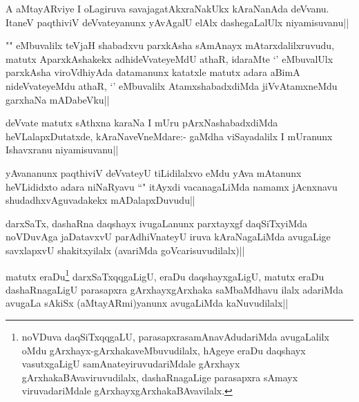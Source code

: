 
\begin{artha}
A aMtayARviye I oLagiruva savajagatAkxraNakUkx kAraNanAda deVvanu. ItaneV paqthiviV deVvateyanunx yAvAgalU elAlx dashegaLalUlx niyamisuvanu||
\end{artha}


\begin{artha}
"\stext " eMbuvalilx teVjaH shabadxvu parxkAsha sAmAnayx mAtarxdalilxruvudu, matutx AparxkAshakekx adhideVvateyeMdU athaR, idaraMte `\stext ' eMbuvalUlx parxkAsha viroVdhiyAda datamanunx katatxle matutx adara aBimA nideVvateyeMdu athaR, `\stext ' eMbuvalilx AtamxshabadxdiMda jiVvAtamxneMdu garxhaNa mADabeVku||
\end{artha}%


\begin{artha}
deVvate matutx sAthxna karaNa I mUru pArxNashabadxdiMda heVLalapxDutatxde, kAraNaveVneMdare:- gaMdha viSayadalilx I mUranunx Ishavxranu niyamisuvanu||
\end{artha}


\begin{artha}
yAvananunx paqthiviV deVvateyU tiLidilalxvo eMdu yAva mAtanunx heVLididxto adara niNaRyavu ``\stext " itAyxdi vacanagaLiMda namamx jAcnxnavu shudadhxvAguvadakekx mADalapxDuvudu||
\end{artha}


\begin{artha}
darxSaTx, dashaRna daqshayx ivugaLanunx parxtayxgf daqSiTxyiMda noVDuvAga jaDatavxvU parAdhiVnateyU iruva kAraNagaLiMda avugaLige savxlapxvU shakitxyilalx (avariMda goVcarisuvudilalx)||
\end{artha}

\begin{artha}%
matutx eraDu\footnote[1]{noVDuva daqSiTxqqgaLU, parasapxrasamAnavAdudariMda avugaLalilx oMdu gArxhayx-gArxhakaveMbuvudilalx, hAgeye eraDu daqshayx vasutxgaLigU samAnateyiruvudariMdale gArxhayx gArxhakaBAvaviruvudilalx, dashaRnagaLige parasapxra sAmayx viruvadariMdale gArxhayxgArxhakaBAvavilalx.} darxSaTxqqgaLigU, eraDu daqshayxgaLigU, matutx eraDu dashaRnagaLigU parasapxra gArxhayxgArxhaka saMbaMdhavu ilalx adariMda avugaLa sAkiSx (aMtayARmi)yanunx avugaLiMda kaNuvudilalx||
\end{artha}

